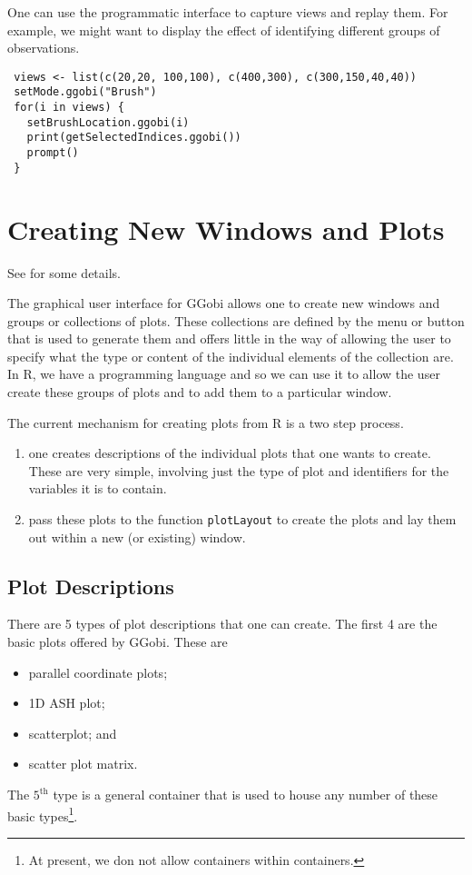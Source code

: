\documentclass{article}
\def\SFunction#1{{\texttt{\red #1}}}
\begin{document}
One can use the programmatic interface to capture views and replay
them.  For example, we might want to display the effect of identifying
different groups of observations.
\begin{verbatim}
 views <- list(c(20,20, 100,100), c(400,300), c(300,150,40,40))
 setMode.ggobi("Brush")
 for(i in views) {
   setBrushLocation.ggobi(i)
   print(getSelectedIndices.ggobi())
   prompt()
 }
\end{verbatim}

\section{Creating New Windows and Plots}
See  for some details.

The graphical user interface for GGobi allows one to create new
windows and groups or collections of plots.  These collections are
defined by the menu or button that is used to generate them and offers
little in the way of allowing the user to specify what the type or
content of the individual elements of the collection are.  In R, we
have a programming language and so we can use it to allow the user
create these groups of plots and to add them to a particular window.


The current mechanism for creating plots from R is a two step process.
\begin{enumerate}
\item one creates descriptions of the individual plots that one
wants to create. These are very simple, involving just the type of
plot and identifiers for the variables it is to contain.
\item pass these plots to the function
\SFunction{plotLayout} to create the plots and lay them out within
a new (or existing) window.
\end{enumerate}

\subsection{Plot Descriptions}
There are 5 types of plot descriptions that one can create.
The first 4 are the basic plots offered by GGobi.
These are
\begin{itemize}
\item parallel coordinate plots;
\item 1D ASH plot;
\item scatterplot; and
\item scatter plot matrix. 
\end{itemize}
The $5^{\mbox{th}}$ type is a general container that 
is used to house any number of these basic types\footnote{At present,
we don not allow containers within containers.}.
\end{document}
